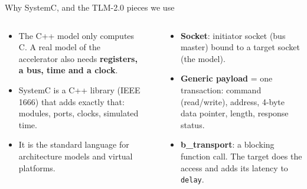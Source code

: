 \documentclass[aspectratio=169,11pt]{beamer}
\newcommand{\file}[1]{\texttt{\textcolor{copper}{#1}}}
\newcommand{\sig}[1]{\texttt{#1}}
\begin{document}
\begin{frame}{Why SystemC, and the TLM-2.0 pieces we use}
  \begin{columns}[T]
    \begin{why}
      \begin{itemize}
        \item The C++ model only computes C. A real model of the accelerator also needs
              \textbf{registers, a bus, time and a clock}.
        \item SystemC is a C++ library (IEEE 1666) that adds exactly that: modules, ports,
              clocks, simulated time.
        \item It is the standard language for architecture models and virtual platforms.
      \end{itemize}
    \end{why}
    \\[3mm]
    \begin{how}
      \begin{itemize}
        \item \textbf{Socket}: initiator socket (bus master) bound to a target socket (the model).
        \item \textbf{Generic payload} = one transaction: command (read/write), address, 4-byte data
              pointer, length, response status.
        \item \textbf{b\_transport}: a blocking function call. The target does the access and adds
              its latency to \sig{delay}.
      \end{itemize}
    \end{how}
  \end{columns}
\end{frame}
\end{document}
